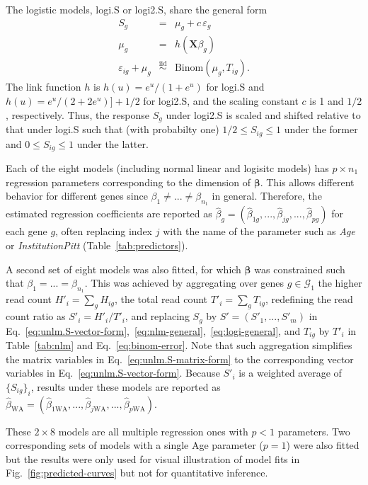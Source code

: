\documentclass[letterpaper]{article}
\begin{document}
The logistic models, logi.S or logi2.S, share the general form
\begin{eqnarray}
S_g &=& \mu_g + c\, \varepsilon_g
\label{eq:logi-general}
\\
\mu_g &=& h(\mathbf{X} \beta_g)
\label{eq:glm-mean-predictor}
\\
\varepsilon_{ig} + \mu_g &\overset{\mathrm{iid}}{\sim}& \mathrm{Binom}(\mu_g, T_{ig}).
\label{eq:binom-error}
\end{eqnarray}
The link function \(h\) is \(h(u) = e^u / (1 + e^u)\) for logi.S and \(h(u) =
e^u / (2 + 2e^u)] + 1/2\) for logi2.S, and the scaling constant \(c\) is 1
 and \(1/2\), respectively.  Thus, the response \(S_g\) under logi2.S is scaled and shifted relative to
that under logi.S such that (with probabilty one) \(1/2\le S_{ig}\le 1\) under the former and
\(0\le S_{ig}\le 1\) under the latter.

Each of the eight models (including normal linear and logisitc models) has \(p\times n_1\) regression parameters corresponding to the
dimension of \(\boldsymbol{\beta}\).  This allows different behavior for
different genes since \(\beta_1\neq ...\neq\beta_{n_1}\) in general.
Therefore, the estimated regression coefficients are reported as \(\hat{\beta}_g =
(\hat{\beta}_{1g},...,\hat{\beta}_{jg},...,\hat{\beta}_{pg})\) for each gene \(g\), often
replacing index \(j\) with the name of the parameter such as \emph{Age} or
\emph{InstitutionPitt} (Table~\ref{tab:predictors}).

A second set of eight models was also
fitted, for which \(\boldsymbol{\beta}\) was constrained such that \(\beta_1 =
... = \beta_{n_1}\).  This was achieved by aggregating over genes
\(g\in\mathcal{G}_1\) the higher read count \(H'_i = \sum_g H_{ig}\), the
total read count \(T'_i = \sum_g T_{ig}\), redefining the read count ratio
as \(S'_i = H'_i / T'_i\), and replacing \(S_g\) by \(S'=(S'_1,...,S'_m)\) in
Eq.~\ref{eq:unlm.S-vector-form},~\ref{eq:nlm-general},~\ref{eq:logi-general}, and \(T_{ig}\) by \(T'_i\) in
Table~\ref{tab:nlm} and Eq.~\ref{eq:binom-error}.  Note that such aggregation
simplifies the matrix variables in Eq.~\ref{eq:unlm.S-matrix-form} to the
corresponding vector variables in Eq.~\ref{eq:unlm.S-vector-form}.  Because \(S'_i\) is a
weighted average of \(\{S_{ig}\}_i\), results under these models are reported
as \(\hat{\beta}_\mathrm{WA} =
(\hat{\beta}_{1\mathrm{WA}},...,\hat{\beta}_{j\mathrm{WA}},...,\hat{\beta}_{p\mathrm{WA}})\).

These \(2\times 8\) models are all multiple regression ones with \(p<1\)
parameters.  Two corresponding sets of models with a single Age parameter
(\(p=1\)) were also fitted but the results were only used for visual
illustration of model fits in Fig.~\ref{fig:predicted-curves} but not for
quantitative inference.
\end{document}
